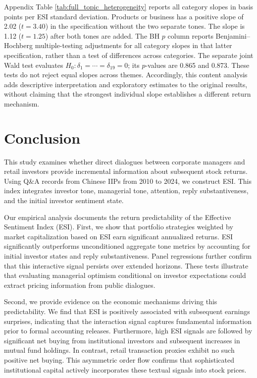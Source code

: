 \documentclass[12pt]{article}
\begin{document}
Appendix Table \ref{tab:full_topic_heterogeneity} reports all category slopes in basis points per ESI standard deviation. Products or business has a positive slope of 2.02 ($t=3.40$) in the specification without the two separate tones. The slope is 1.12 ($t=1.25$) after both tones are added. The BH $p$ column reports Benjamini--Hochberg multiple-testing adjustments for all category slopes in that latter specification, rather than a test of differences across categories. The separate joint Wald test evaluates $H_0:\delta_1=\cdots=\delta_{19}=0$; its $p$-values are 0.865 and 0.873. These tests do not reject equal slopes across themes. Accordingly, this content analysis adds descriptive interpretation and exploratory estimates to the original results, without claiming that the strongest individual slope establishes a different return mechanism.

\section{Conclusion}\label{sec:conclusion}

This study examines whether direct dialogues between corporate managers and retail investors provide incremental information about subsequent stock returns. Using Q\&A records from Chinese IIPs from 2010 to 2024, we construct ESI. This index integrates investor tone, managerial tone, attention, reply substantiveness, and the initial investor sentiment state.

Our empirical analysis documents the return predictability of the Effective Sentiment Index (ESI). First, we show that portfolio strategies weighted by market capitalization based on ESI earn significant annualized returns. ESI significantly outperforms unconditioned aggregate tone metrics by accounting for initial investor states and reply substantiveness. Panel regressions further confirm that this interactive signal persists over extended horizons. These tests illustrate that evaluating managerial optimism conditional on investor expectations could extract pricing information from public dialogues.

Second, we provide evidence on the economic mechanisms driving this predictability. We find that ESI is positively associated with subsequent earnings surprises, indicating that the interaction signal captures fundamental information prior to formal accounting releases. Furthermore, high ESI signals are followed by significant net buying from institutional investors and subsequent increases in mutual fund holdings. In contrast, retail transaction proxies exhibit no such positive net buying. This asymmetric order flow confirms that sophisticated institutional capital actively incorporates these textual signals into stock prices.
\end{document}
